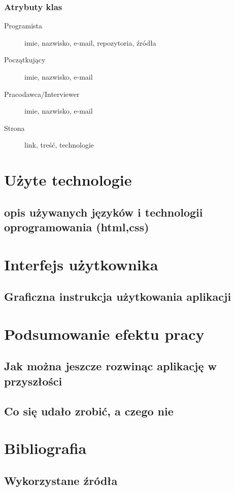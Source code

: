 \documentclass[11pt]{article}
\begin{document}
\subsubsection{Atrybuty klas}
\label{sec:orgcddf231}
\begin{description}
\item[{Programista}] imie, nazwisko, e-mail, repozytoria, źródła
\item[{Początkujący}] imie, nazwisko, e-mail
\item[{Pracodawca/Interviewer}] imie, nazwisko, e-mail
\item[{Strona}] link, treść, technologie
\end{description}

\section{Użyte technologie}
\label{sec:orge0ecf99}
\subsection{opis używanych języków i technologii oprogramowania (html,css)}
\label{sec:orgf553df0}
\section{Interfejs użytkownika}
\label{sec:orga049521}
\subsection{Graficzna instrukcja użytkowania aplikacji}
\label{sec:org19ff35c}
\section{Podsumowanie efektu pracy}
\label{sec:orgcc13221}
\subsection{Jak można jeszcze rozwinąc aplikację w przyszłości}
\label{sec:orgda43569}
\subsection{Co się udało zrobić, a czego nie}
\label{sec:org4487dd1}
\section{Bibliografia}
\label{sec:org66283bb}
\subsection{Wykorzystane źródła}
\label{sec:org81b4f4a}
\end{document}
